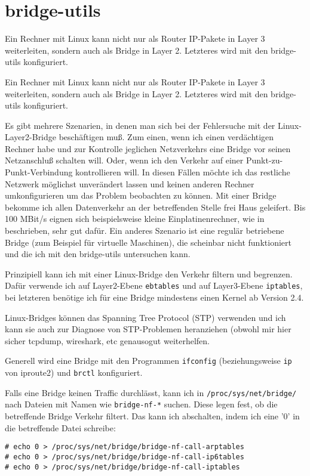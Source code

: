 \section{bridge-utils}
\label{sec:netz-werkzeuge-bridge-utils}
\begin{abstractsec}
  Ein Rechner mit Linux kann nicht nur als Router IP-Pakete in Layer 3
  weiterleiten, sondern auch als Bridge in Layer 2. Letzteres wird mit den
  bridge-utils konfiguriert.
\end{abstractsec}
\begin{normaltext}
  Ein Rechner mit Linux kann nicht nur als Router IP-Pakete in Layer 3
  weiterleiten, sondern auch als Bridge in Layer 2. Letzteres wird mit den
  bridge-utils konfiguriert.

  Es gibt mehrere Szenarien, in denen man sich bei der Fehlersuche mit der
  Linux-Layer2-Bridge beschäftigen muß. Zum einen, wenn ich einen verdächtigen
  Rechner habe und zur Kontrolle jeglichen Netzverkehrs eine Bridge vor seinen
  Netzanschluß schalten will. Oder, wenn ich den Verkehr auf einer
  Punkt-zu-Punkt-Verbindung kontrollieren will. In diesen Fällen möchte ich
  das restliche Netzwerk möglichst unverändert lassen und keinen anderen
  Rechner umkonfigurieren um das Problem beobachten zu können. Mit einer
  Bridge bekomme ich allen Datenverkehr an der betreffenden Stelle frei Haus
  geleifert. Bis 100 MBit/s eignen sich beispielsweise kleine
  Einplatinenrechner, wie in \cite{weidner12:linuxkopflos} beschrieben, sehr
  gut dafür. Ein anderes Szenario ist eine regulär betriebene Bridge (zum
  Beispiel für virtuelle Maschinen), die scheinbar nicht funktioniert und die
  ich mit den bridge-utils untersuchen kann.

  Prinzipiell kann ich mit einer Linux-Bridge den Verkehr filtern und
  begrenzen. Dafür verwende ich auf Layer2-Ebene \verb?ebtables? und auf
  Layer3-Ebene \verb?iptables?, bei letzteren benötige ich für eine Bridge
  mindestens einen Kernel ab Version 2.4.

  Linux-Bridges können das Spanning Tree Protocol (STP) verwenden und ich kann
  sie auch zur Diagnose von STP-Problemen heranziehen (obwohl mir hier sicher
  tcpdump, wireshark, etc genausogut weiterhelfen.

  Generell wird eine Bridge mit den Programmen \verb?ifconfig?
  (beziehungsweise \verb?ip? von iproute2) und \verb?brctl? konfiguriert.

  Falls eine Bridge keinen Traffic durchlässt, kann ich in
  \verb?/proc/sys/net/bridge/? nach Dateien mit Namen wie \verb?bridge-nf-*?
  suchen. Diese legen fest, ob die betreffende Bridge Verkehr filtert. Das
  kann ich abschalten, indem ich eine '0' in die betreffende Datei schreibe:
  \begin{verbatim}
# echo 0 > /proc/sys/net/bridge/bridge-nf-call-arptables
# echo 0 > /proc/sys/net/bridge/bridge-nf-call-ip6tables
# echo 0 > /proc/sys/net/bridge/bridge-nf-call-iptables
  \end{verbatim}


\end{normaltext}
